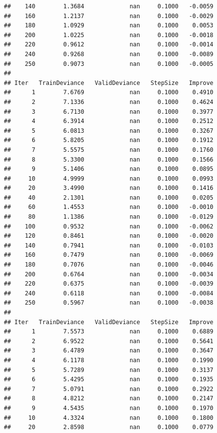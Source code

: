 \documentclass[
]{book}
\begin{document}
\begin{verbatim}
##    140        1.3684             nan     0.1000   -0.0059
##    160        1.2137             nan     0.1000   -0.0029
##    180        1.0929             nan     0.1000    0.0053
##    200        1.0225             nan     0.1000   -0.0018
##    220        0.9612             nan     0.1000   -0.0014
##    240        0.9268             nan     0.1000   -0.0089
##    250        0.9073             nan     0.1000   -0.0005
## 
## Iter   TrainDeviance   ValidDeviance   StepSize   Improve
##      1        7.6769             nan     0.1000    0.4910
##      2        7.1336             nan     0.1000    0.4624
##      3        6.7130             nan     0.1000    0.3977
##      4        6.3914             nan     0.1000    0.2512
##      5        6.0813             nan     0.1000    0.3267
##      6        5.8205             nan     0.1000    0.1912
##      7        5.5575             nan     0.1000    0.1760
##      8        5.3300             nan     0.1000    0.1566
##      9        5.1406             nan     0.1000    0.0895
##     10        4.9999             nan     0.1000    0.0993
##     20        3.4990             nan     0.1000    0.1416
##     40        2.1301             nan     0.1000    0.0205
##     60        1.4553             nan     0.1000   -0.0010
##     80        1.1386             nan     0.1000   -0.0129
##    100        0.9532             nan     0.1000   -0.0062
##    120        0.8461             nan     0.1000   -0.0020
##    140        0.7941             nan     0.1000   -0.0103
##    160        0.7479             nan     0.1000   -0.0069
##    180        0.7076             nan     0.1000   -0.0046
##    200        0.6764             nan     0.1000   -0.0034
##    220        0.6375             nan     0.1000   -0.0039
##    240        0.6118             nan     0.1000   -0.0084
##    250        0.5967             nan     0.1000   -0.0038
## 
## Iter   TrainDeviance   ValidDeviance   StepSize   Improve
##      1        7.5573             nan     0.1000    0.6889
##      2        6.9522             nan     0.1000    0.5641
##      3        6.4789             nan     0.1000    0.3647
##      4        6.1178             nan     0.1000    0.1990
##      5        5.7289             nan     0.1000    0.3137
##      6        5.4295             nan     0.1000    0.1935
##      7        5.0791             nan     0.1000    0.2922
##      8        4.8212             nan     0.1000    0.2147
##      9        4.5435             nan     0.1000    0.1970
##     10        4.3324             nan     0.1000    0.1800
##     20        2.8598             nan     0.1000    0.0779

\end{verbatim}
\end{document}
